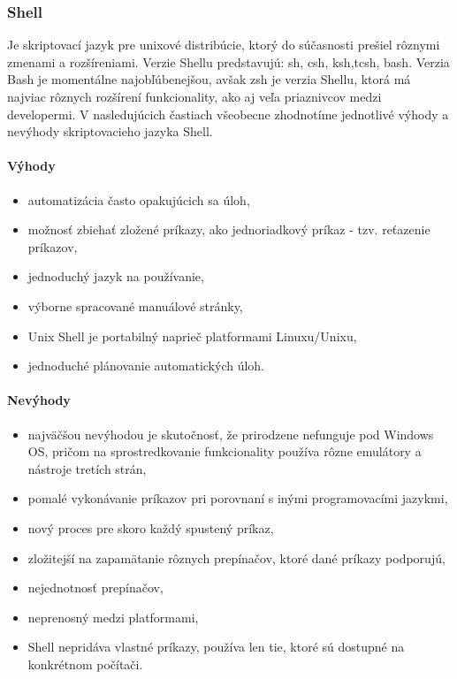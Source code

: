 \subsubsection{Shell}
\indent
Je skriptovací jazyk pre unixové distribúcie, ktorý do súčasnosti prešiel rôznymi zmenami a rozšíreniami. Verzie Shellu predstavujú: sh, csh, ksh,tcsh, bash. Verzia Bash je momentálne najobľúbenejšou, avšak zsh je verzia Shellu, ktorá má najviac rôznych rozšírení funkcionality, ako aj veľa priaznivcov medzi developermi. V nasledujúcich častiach všeobecne zhodnotíme jednotlivé výhody a nevýhody skriptovacieho jazyka Shell.

\paragraph{Výhody}
\begin{itemize}
	\item automatizácia často opakujúcich sa úloh,
	\item možnosť zbiehať zložené príkazy, ako jednoriadkový príkaz  - tzv. reťazenie príkazov,
	\item jednoduchý jazyk na používanie,
	\item výborne spracované manuálové stránky,
	\item Unix Shell je portabilný naprieč platformami Linuxu/Unixu,
	\item jednoduché plánovanie automatických úloh.
	\newline
\end{itemize}
\paragraph{Nevýhody}
\begin{itemize}
	\item najväčšou nevýhodou je skutočnosť, že prirodzene nefunguje pod Windows OS, pričom na sprostredkovanie funkcionality používa rôzne emulátory a nástroje tretích strán,
	\item pomalé vykonávanie príkazov pri porovnaní s inými programovacími jazykmi,
	\item nový proces pre skoro každý spustený príkaz,
	\item zložitejší na zapamätanie rôznych prepínačov, ktoré dané príkazy podporujú,
	\item nejednotnosť prepínačov,
	\item neprenosný medzi platformami,
	\item Shell nepridáva vlastné príkazy, používa len tie, ktoré sú dostupné na konkrétnom počítači.
\end{itemize}

